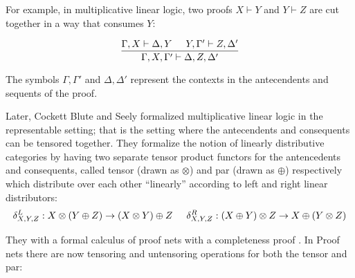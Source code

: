 For example, in multiplicative linear logic, two proofs $X \vdash Y$ and $Y \vdash Z$ are cut together in a way that consumes $Y$:

$$
\dfrac{\Gamma, X\vdash \Delta,Y \hspace{.5cm}  Y,\Gamma'\vdash Z,\Delta'}{\Gamma,X,\Gamma' \vdash \Delta, Z, \Delta'}
$$

The symbols $\Gamma,\Gamma'$ and $\Delta,\Delta'$ represent the contexts in the antecendents and sequents of the proof.

Later, Cockett Blute and Seely formalized  multiplicative linear logic in the representable setting; that is the setting where the antecendents and consequents can be tensored together.
They formalize the notion of linearly distributive categories by having two separate tensor product functors for the antencedents and consequents, called tensor (drawn as $\otimes$) and par (drawn as $\oplus$) respectively which distribute over each other ``linearly'' according to left and right linear distributors:
$$
\delta_{X,Y,Z}^L: X \otimes (Y\oplus Z) \to (X\otimes Y)\oplus Z
\hspace*{.5cm}
\delta_{X,Y,Z}^R: (X\oplus Y) \otimes Z \to X\oplus (Y \otimes Z)
$$



They with a formal calculus of proof nets with a completeness proof \cite{ldc}.  In Proof nets there are now tensoring and untensoring operations for both the tensor and par:

